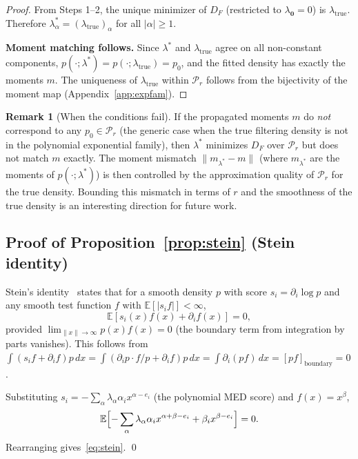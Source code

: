 \documentclass{article}
\newcommand{\E}{\mathbb{E}}
\theoremstyle{definition}
\newtheorem{remark}{Remark}
\begin{document}
\begin{proof}
From Steps 1--2, the unique minimizer of $D_F$
(restricted to $\lambda_{\mathbf{0}} = 0$) is $\lambda_{\mathrm{true}}$.
Therefore $\lambda^*_\alpha = (\lambda_{\mathrm{true}})_\alpha$ for all $|\alpha| \ge 1$.

\textbf{Moment matching follows.}
Since $\lambda^*$ and $\lambda_{\mathrm{true}}$ agree on all non-constant components,
$p(\cdot;\lambda^*) = p(\cdot;\lambda_{\mathrm{true}}) = p_0$,
and the fitted density has exactly the moments $m$.
The uniqueness of $\lambda_{\mathrm{true}}$ within $\mathcal{P}_r$ follows from
the bijectivity of the moment map (Appendix~\ref{app:expfam}).
\end{proof}

\begin{remark}[When the conditions fail]
If the propagated moments $m$ do \emph{not} correspond to any
$p_0 \in \mathcal{P}_r$ (the generic case when the true filtering
density is not in the polynomial exponential family), then
$\lambda^*$ minimizes $D_F$ over $\mathcal{P}_r$ but does not
match $m$ exactly.
The moment mismatch $\|m_{\lambda^*} - m\|$
(where $m_{\lambda^*}$ are the moments of $p(\cdot;\lambda^*)$)
is then controlled by the approximation quality of $\mathcal{P}_r$
for the true density.
Bounding this mismatch in terms of $r$ and the smoothness of the
true density is an interesting direction for future work.
\end{remark}

\subsection{Proof of Proposition~\ref{prop:stein} (Stein identity)}

Stein's identity~\cite{stein1972} states that for a smooth density $p$ with score
$s_i = \partial_i \log p$ and any smooth test function $f$
with $\E[|s_i f|] < \infty$,
\begin{equation}
    \E[s_i(x) f(x) + \partial_i f(x)] = 0,
\end{equation}
provided $\lim_{\|x\|\to\infty} p(x)f(x) = 0$
(the boundary term from integration by parts vanishes).
This follows from
$\int (s_i f + \partial_i f) p\,dx
= \int (\partial_i p \cdot f / p + \partial_i f) p\,dx
= \int \partial_i(p f)\,dx = [pf]_{\text{boundary}} = 0$.

Substituting $s_i = -\sum_\alpha \lambda_\alpha \alpha_i x^{\alpha-e_i}$
(the polynomial MED score) and $f(x) = x^\beta$,
\begin{equation}
    \E\Bigl[-\sum_\alpha \lambda_\alpha \alpha_i x^{\alpha+\beta-e_i}
    + \beta_i x^{\beta-e_i}\Bigr] = 0.
\end{equation}
Rearranging gives~\eqref{eq:stein}.
\qed
\end{document}
